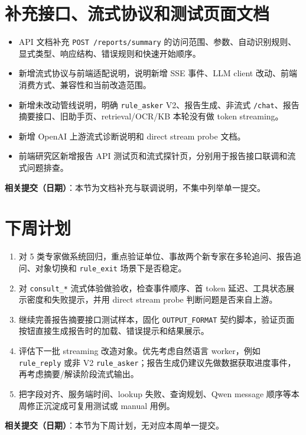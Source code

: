\documentclass[UTF8]{ctexart}
\begin{document}
\section{补充接口、流式协议和测试页面文档}

\begin{itemize}
\item API 文档补充 \texttt{POST /reports/summary} 的访问范围、参数、自动识别规则、显式类型、响应结构、错误规则和快速开始顺序。
\item 新增流式协议与前端适配说明，说明新增 SSE 事件、LLM client 改动、前端消费方式、兼容性和当前改造范围。
\item 新增未改动管线说明，明确 \texttt{rule\_asker} V2、报告生成、非流式 \texttt{/chat}、报告摘要接口、旧助手页、retrieval/OCR/KB 本轮没有做 token streaming。
\item 新增 OpenAI 上游流式诊断说明和 direct stream probe 文档。
\item 前端研究区新增报告 API 测试页和流式探针页，分别用于报告接口联调和流式问题排查。
\end{itemize}

\textbf{相关提交（日期）}：本节为文档补充与联调说明，不集中列举单一提交。

\section{下周计划}

\begin{enumerate}
\item 对 5 类专家做系统回归，重点验证单位、事故两个新专家在多轮追问、报告追问、对象切换和 \texttt{rule\_exit} 场景下是否稳定。

\item 对 \texttt{consult\_*} 流式体验做验收，检查事件顺序、首 token 延迟、工具状态展示密度和失败提示，并用 direct stream probe 判断问题是否来自上游。

\item 继续完善报告摘要接口测试样本，固化 \texttt{OUTPUT\_FORMAT} 契约脚本，验证页面按钮直接生成报告时的加载、错误提示和结果展示。

\item 评估下一批 streaming 改造对象。优先考虑自然语言 worker，例如 \texttt{rule\_reply} 或非 V2 \texttt{rule\_asker}；报告生成仍建议先做数据获取进度事件，再考虑摘要/解读阶段流式输出。

\item 把字段对齐、服务端时间、lookup 失败、查询规划、Qwen message 顺序等本周修正沉淀成可复用测试或 manual 用例。
\end{enumerate}

\textbf{相关提交（日期）}：本节为下周计划，无对应本周单一提交。
\end{document}
